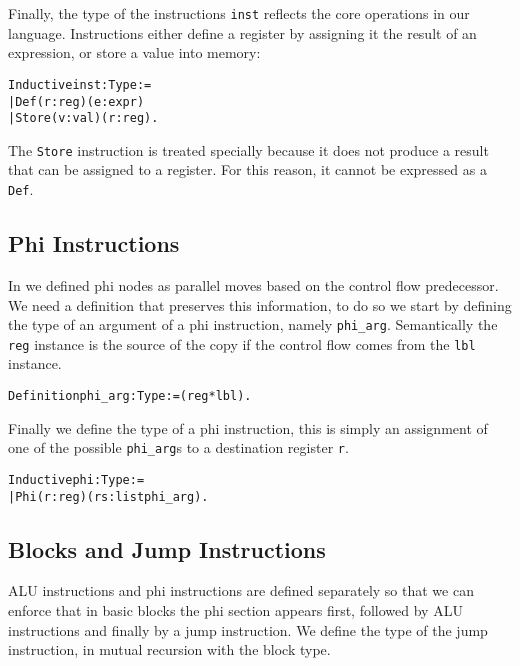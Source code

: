 Finally, the type of the instructions \texttt{inst} reflects the core operations in our language. Instructions either define a register by assigning it the result of an expression, or store a value into memory:

\begin{alltt}
Inductive inst : Type :=
  | Def (r : reg) (e : expr)
  | Store (v : val) (r : reg).
\end{alltt}

The \texttt{Store} instruction is treated specially because it does not produce a result that can be assigned to a register. For this reason, it cannot be expressed as a \texttt{Def}.

\subsection{Phi Instructions}

In  we defined phi nodes as parallel moves based on the control flow predecessor.
We need a definition that preserves this information, to do so we start by defining the type of an argument of a phi instruction, namely \texttt{phi\_arg}. Semantically the \texttt{reg} instance is the source of the copy if the control flow comes from the \texttt{lbl} instance.

\begin{alltt}
Definition phi_arg : Type := (reg * lbl).
\end{alltt}

Finally we define the type of a phi instruction, this is simply an assignment of one of the possible \texttt{phi\_arg}s to a destination register \texttt{r}.

\begin{alltt}
Inductive phi : Type :=
| Phi (r : reg) (rs: list phi_arg).
\end{alltt}


\subsection{Blocks and Jump Instructions}

ALU instructions and phi instructions are defined separately so that we can enforce that in basic blocks the phi section appears first, followed by ALU instructions and finally by a jump instruction.
We define the type of the jump instruction, in mutual recursion with the block type.

